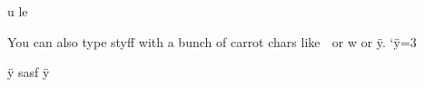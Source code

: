 
 u  le  %


You can also type styff with a bunch of carrot chars like
^^_ or ^^7 or ^^ff.
\catcode`^^ff=3

^^ff sasf ^^ff












